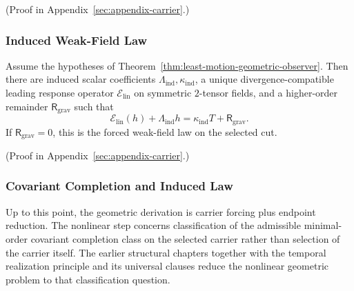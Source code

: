 (Proof in Appendix~\ref{sec:appendix-carrier}.)

\subsubsection{Induced Weak-Field Law}

\begin{theorem}
\label{thm:weak-field-geometric-response-law}
Assume the hypotheses of
Theorem~\ref{thm:least-motion-geometric-observer}. Then there are
induced scalar coefficients \(\Lambda_{\mathrm{ind}},\kappa_{\mathrm{ind}}\), a
unique divergence-compatible leading response operator
\(\mathcal E_{\mathrm{lin}}\) on symmetric \(2\)-tensor fields, and a
higher-order remainder \(\mathsf R_{\mathrm{grav}}\) such that
\[
\mathcal E_{\mathrm{lin}}(h)+\Lambda_{\mathrm{ind}}h
=
\kappa_{\mathrm{ind}}T+\mathsf R_{\mathrm{grav}}.
\]
If \(\mathsf R_{\mathrm{grav}}=0\), this is the forced weak-field law on the
selected cut.
\end{theorem}

(Proof in Appendix~\ref{sec:appendix-carrier}.)

\subsubsection{Covariant Completion and Induced Law}

\begin{remark}
\label{rem:nonlinear-completion-locus}
Up to this point, the geometric derivation is carrier forcing plus endpoint
reduction. The nonlinear step concerns classification of the admissible
minimal-order covariant completion class on the selected carrier rather than
selection of the carrier itself. The earlier structural chapters together with
the temporal
realization principle and its universal clauses reduce the nonlinear geometric
problem to that classification question.
\end{remark}

